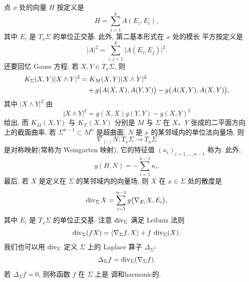 点 $x$ 处的向量 $H$
按定义是
\begin{equation}
H=\sum_{i=1}^{k}A(E_i,E_i),
\label{eq:1.26}
\end{equation}
其中 $E_i$ 是 $T_x\Sigma$ 的单位正交基. 此外, 第二基本形式在 $x$ 处的模长
平方按定义是
\begin{equation}
|A|^2=\sum_{i,j=1}^{k}\bigl|A(E_i,E_j)\bigr|^2.
\label{eq:1.27}
\end{equation}
还要回忆 Gauss 方程: 若 $X,Y\in T_x\Sigma$, 则
\begin{align}
K_{\Sigma}(X,Y)|X\wedge Y|^2
 &=K_M(X,Y)|X\wedge Y|^2 \notag\\
 &\quad+g\bigl(A(X,X),A(Y,Y)\bigr)-g\bigl(A(X,Y),A(X,Y)\bigr),
\label{eq:1.28}
\end{align}
其中 $|X\wedge Y|^2$ 由
\begin{equation}
|X\wedge Y|^2=g(X,X)g(Y,Y)-g(X,Y)^2
\label{eq:1.29}
\end{equation}
给出, 而 $K_M(X,Y)$ 与 $K_{\Sigma}(X,Y)$ 分别是 $M$ 与 $\Sigma$ 在 $X$、$Y$
张成的二平面方向上的截面曲率. 若 $\Sigma^{n-1}\subset M^n$ 是超曲面, $N$ 是
$x$ 的某邻域内的单位法向量场, 则
\begin{equation}
\nabla_{(\cdot)}N:T_x\Sigma\to T_x\Sigma
\label{eq:1.30}
\end{equation}
是对称映射(常称为 Weingarten 映射), 它的特征值 $(\kappa_i)_{i=1,\dots,n-1}$
称为. 此外,
\begin{equation}
g(H,N)=-\sum_{i=1}^{n-1}\kappa_i.
\label{eq:1.31}
\end{equation}
最后, 若 $X$ 是定义在 $\Sigma$ 的某邻域内的向量场, 则 $X$ 在 $x\in\Sigma$
处的散度是
\begin{equation}
\operatorname{div}_{\Sigma}X=\sum_{i=1}^{n-1}g\bigl(\nabla_{E_i}X,E_i\bigr),
\label{eq:1.32}
\end{equation}
其中 $E_i$ 是 $T_x\Sigma$ 的单位正交基. 注意 $\operatorname{div}_{\Sigma}$ 满足 Leibniz
法则
\begin{equation}
\operatorname{div}_{\Sigma}(fX)=\langle\nabla_{\Sigma}f,X\rangle
  +f\,\operatorname{div}_{\Sigma}(X).
\label{eq:1.33}
\end{equation}
我们也可以用 $\operatorname{div}_{\Sigma}$ 定义 $\Sigma$ 上的 Laplace 算子
$\Delta_{\Sigma}$:
\begin{equation}
\Delta_{\Sigma}f=\operatorname{div}_{\Sigma}(\nabla_{\Sigma}f).
\label{eq:1.34}
\end{equation}
若 $\Delta_{\Sigma}f=0$, 则称函数 $f$ 在 $\Sigma$ 上是
{调和}{harmonic}的.

